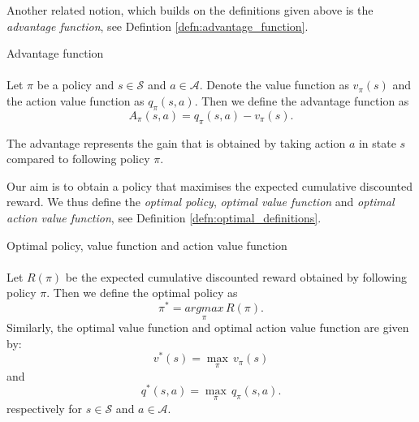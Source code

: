 Another related notion, which builds on the definitions given above is the \textit{advantage function}, see Defintion \ref{defn:advantage_function}.
\begin{defn}{Advantage function} \label{defn:advantage_function}
\\
\cite[Section 3]{a3c_paper}
\\
Let $\pi$ be a policy and $s \in \mathcal{S}$ and $a \in \mathcal{A}$. Denote the value function as $v_{\pi}(s)$ and the action value function as $q_{\pi}(s,a)$. Then we define the advantage function  as
\begin{equation*}
 A_{\pi}(s,a) = q_{\pi}(s,a) - v_{\pi}(s).
\end{equation*}
\end{defn}
The advantage represents the gain that is obtained by taking action $a$ in state $s$ compared to following policy $\pi$.

Our aim is to obtain a policy that maximises the expected cumulative discounted reward. We thus define the \textit{optimal policy}, \textit{optimal value function} and \textit{optimal action value function}, see Definition \ref{defn:optimal_definitions}.

\begin{defn}{Optimal policy, value function and action value function} 
\label{defn:optimal_definitions} 
\\
\cite[Section 3.6]{sutton2018reinforcement}
\\
Let $R(\pi)$ be the expected cumulative discounted reward obtained by following policy $\pi$. Then we define the optimal policy as
\begin{equation*}
 	\pi^* = \underset{\pi}{argmax} \, R(\pi).
\end{equation*}
Similarly, the optimal value function and optimal action value function are given by: 
\begin{equation*}
 	v^*(s) = \underset{\pi}{\max} \, v_{\pi}(s)
\end{equation*}
and
\begin{equation*}
 	q^*(s,a) = \underset{\pi}{\max} \, q_{\pi}(s,a).
\end{equation*}
respectively for $s \in \mathcal{S}$ and $a \in \mathcal{A}$.
\end{defn}

